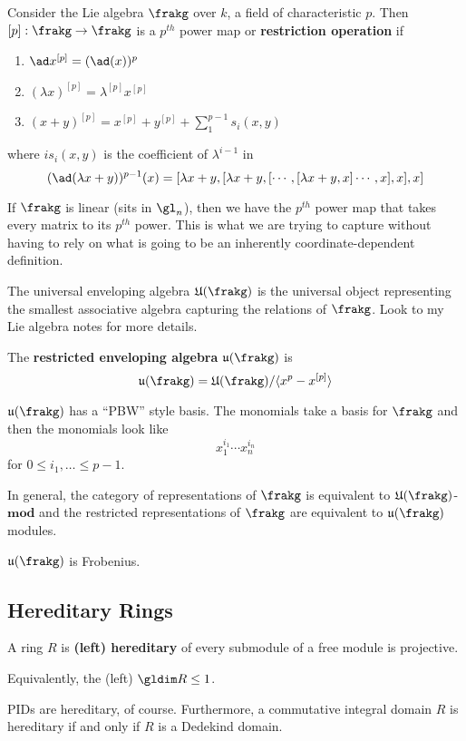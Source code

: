 \documentclass[12pt]{article}
\begin{document}
\begin{ex}
	Consider the Lie algebra $\frakg$ over $k$, a field of characteristic $p$. Then $[p]:\frakg\to \frakg$
	is a $p^{th}$ power map or \textbf{restriction operation} if
	\begin{enumerate}
		\item $\ad x^{[p]}=(\ad(x))^p$
		\item $(\lambda x)^{[p]}=\lambda^{[p]}x^{[p]}$
		\item $(x+y)^{[p]}=x^{[p]}+y^{[p]}+\sum_1^{p-1}s_i(x,y)$
	\end{enumerate}
	where $is_i(x,y)$ is the coefficient of $\lambda^{i-1}$ in 
	\[(\ad(\lambda x+y))^{p-1}(x)=[\lambda x+y,[\lambda x+y,[\cdots,[\lambda x + y,x]\cdots,x],x],x]\]
\end{ex}
\begin{rmk}
	If $\frakg$ is linear (sits in $\gl_n$), then we have the $p^{th}$ power map that takes every matrix 
	to its $p^{th}$ power. This is what we are trying to capture without having to rely on what is going to be 
	an inherently coordinate-dependent definition.
\end{rmk}

\begin{defn}
	The universal enveloping algebra $\mathfrak{U}(\frakg)$ is the universal object representing the smallest
	associative algebra capturing the relations of $\frakg$. Look to my Lie algebra notes for more details.
\end{defn}
\begin{defn}
	The \textbf{restricted enveloping algebra} $\mathfrak{u}(\frakg)$ is 
	\[\mathfrak{u}(\frakg)=\mathfrak{U}(\frakg)/\langle x^p-x^{[p]}\rangle\]
\end{defn}
\begin{prop}
	$\mathfrak{u}(\frakg)$ has a ``PBW'' style basis. The monomials take a basis for $\frakg$ and 
	then the monomials look like 
	\[x_1^{i_1}\cdots x_n^{i_n}\]
	for $0\le i_1,\dots\le p-1$.
\end{prop}
In general, the category of representations of $\frakg$ is equivalent to $\mathfrak{U}(\frakg)$-$\mathbf{mod}$
and the restricted representations of $\frakg$ are equivalent to $\mathfrak{u}(\frakg)$ modules.
\begin{prop}
	$\mathfrak{u}(\frakg)$ is Frobenius.
\end{prop}
\subsection{Hereditary Rings}
\begin{defn}
	A ring $R$ is \textbf{(left) hereditary} of every submodule of a free module is projective.
\end{defn}
\begin{rmk}
	Equivalently, the (left) $\gldim R\le 1$.
\end{rmk}
\begin{ex}
	PIDs are hereditary, of course. Furthermore, a commutative integral domain $R$ is hereditary if and only if $R$
	is a Dedekind domain.
\end{ex}
\end{document}
